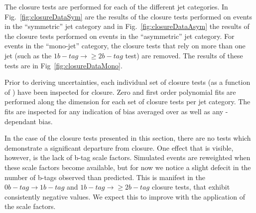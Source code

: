 The closure tests are performed for each of the different jet
categories. In Fig.~\ref{fig:closureDataSym} are the results of the
closure tests performed on events in the ``symmetric'' jet category
and in Fig.~\ref{fig:closureDataAsym} the results of the closure tests
performed on events in the ``asymmetric'' jet
category. For events in the ``mono-jet'' category, the closure tests
that rely on more than one jet (such as the $1 b-tag\rightarrow\geq 2
b-tag$ test) are removed. The results of these tests are in
Fig~\ref{fig:closureDataMono}.

Prior to deriving uncertainties, each individual set of closure tests
(as a function of \scalht) have been inspected for closure. Zero and first order
polynomial fits are performed along the \scalht dimension for each set
of closure tests per jet category. The fits are inspected for any
indication of bias averaged over \scalht as well as any
\scalht-dependant bias.

In the case of the closure tests presented in this section, there are
no tests which demonstrate a significant departure from closure. One
effect that is visible, however, is the lack of b-tag scale factors.
Simulated events are reweighted when these scale factors become
available, but for now we notice a slight defecit in the number of
b-tags observed than predicted. This is manifest in the $0 b-tag
\rightarrow 1 b-tag$ and $1 b-tag \rightarrow \geq 2 b-tag$ closure
tests, that exhibit consistently negative values. We expect this to
improve with the application of the scale factors. 

